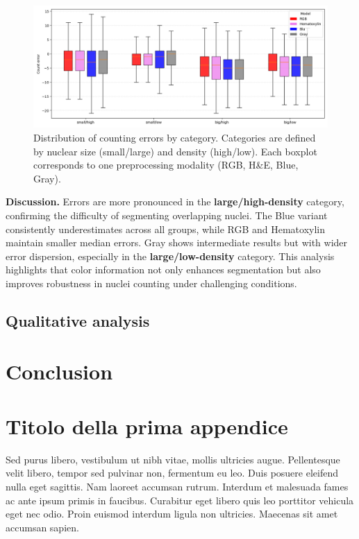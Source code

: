 \documentclass[target=bach,aauheader=,style=]{thud}
\begin{document}
\begin{figure}[h]
    \centering
    \includegraphics[width=\textwidth]{imgs/boxplot.png}
    \caption{Distribution of counting errors by category. Categories are defined by nuclear size (small/large) and density (high/low). Each boxplot corresponds to one preprocessing modality (RGB, H\&E, Blue, Gray).}
    \label{fig:boxplot_categories}
\end{figure}

\noindent\textbf{Discussion.} 
Errors are more pronounced in the \textbf{large/high-density} category, confirming the difficulty of segmenting overlapping nuclei. 
The Blue variant consistently underestimates across all groups, while RGB and Hematoxylin maintain smaller median errors. 
Gray shows intermediate results but with wider error dispersion, especially in the \textbf{large/low-density} category. 
This analysis highlights that color information not only enhances segmentation but also improves robustness in nuclei counting under challenging conditions.
\section{Qualitative analysis}
\chapter{Conclusion}
\appendix


\chapter{Titolo della prima appendice}
Sed purus libero, vestibulum ut nibh vitae, mollis ultricies augue. Pellentesque velit libero, tempor sed pulvinar non, fermentum eu leo. Duis posuere eleifend nulla eget sagittis. Nam laoreet accumsan rutrum. Interdum et malesuada fames ac ante ipsum primis in faucibus. Curabitur eget libero quis leo porttitor vehicula eget nec odio. Proin euismod interdum ligula non ultricies. Maecenas sit amet accumsan sapien.
\end{document}
